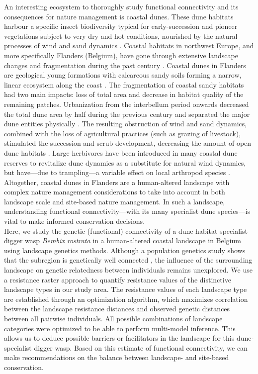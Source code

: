 \documentclass[10pt, twoside]{book} %
\begin{document}
	An interesting ecosystem to thoroughly study functional connectivity and its consequences for nature management is coastal dunes. These dune habitats harbour a specific insect biodiversity typical for early-succession and pioneer vegetations subject to very dry and hot conditions, nourished by the natural processes of wind and sand dynamics \citep{maes2006}. Coastal habitats in northwest Europe, and more specifically Flanders (Belgium), have gone through extensive landscape changes and fragmentation during the past century \citep{provoost2011}. Coastal dunes in Flanders are geological young formations with calcareous sandy soils forming a narrow, linear ecosystem along the coast \citep{provoost2004, decleer2007}. The fragmentation of coastal sandy habitats had two main impacts: loss of total area and decrease in habitat quality of the remaining patches. Urbanization from the interbellum period onwards decreased the total dune area by half during the previous century and separated the major dune entities physically \citep{provoost2004a}. The resulting obstruction of wind and sand dynamics, combined with the loss of agricultural practices (such as grazing of livestock), stimulated the succession and scrub development, decreasing the amount of open dune habitats \citep{provoost2011}. Large herbivores have been introduced in many coastal dune reserves to revitalize dune dynamics as a substitute for natural wind dynamics, but have---due to trampling---a variable effect on local arthropod species \citep[chapter \ref{chapter3}]{bonte2008, vanklink2015, batsleer2022a}. Altogether, coastal dunes in Flanders are a human-altered landscape with complex nature management considerations to take into account in both landscape scale and site-based nature management. In such a landscape, understanding functional connectivity---with its many specialist dune species---is vital to make informed conservation decisions.\\
	
	Here, we study the genetic (functional) connectivity of a dune-habitat specialist digger wasp \textit{Bembix rostrata} in a human-altered coastal landscape in Belgium using landscape genetics methods. Although a population genetics study shows that the subregion is genetically well connected \citep[chapter \ref{chapter4}]{batsleer2022b}, the influence of the surrounding landscape on genetic relatedness between individuals remains unexplored. We use a resistance raster approach to quantify resistance values of the distinctive landscape types in our study area. The resistance values of each landscape type are established through an optimization algorithm, which maximizes correlation between the landscape resistance distances and observed genetic distances between all pairwise individuals. All possible combinations of landscape categories were optimized to be able to perform multi-model inference. This allows us to deduce possible barriers or facilitators in the landscape for this dune-specialist digger wasp. Based on this estimate of functional connectivity, we can make recommendations on the balance between landscape- and site-based conservation.\\
	\clearpage
\end{document}

